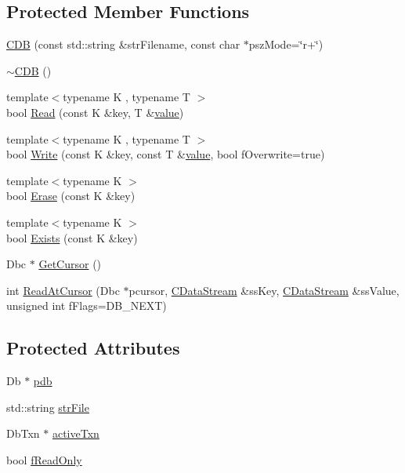 \subsection*{Protected Member Functions}
\begin{DoxyCompactItemize}
\item 
\hyperlink{class_c_d_b_aa5f2317ab28c6424bfebdaa969aa2b2c}{C\+D\+B} (const std\+::string \&str\+Filename, const char $\ast$psz\+Mode=\char`\"{}r+\char`\"{})
\item 
\hyperlink{class_c_d_b_af4f5b02f07e4c381c17c926bc6853bf7}{$\sim$\+C\+D\+B} ()
\item 
{\footnotesize template$<$typename K , typename T $>$ }\\bool \hyperlink{class_c_d_b_adfd2c079df629d5f7cac0ca923ffd698}{Read} (const K \&key, T \&\hyperlink{cache_8cc_a0f61d63b009d0880a89c843bd50d8d76}{value})
\item 
{\footnotesize template$<$typename K , typename T $>$ }\\bool \hyperlink{class_c_d_b_a7fb5b4fa36e57e17287f2c1c762bd708}{Write} (const K \&key, const T \&\hyperlink{cache_8cc_a0f61d63b009d0880a89c843bd50d8d76}{value}, bool f\+Overwrite=true)
\item 
{\footnotesize template$<$typename K $>$ }\\bool \hyperlink{class_c_d_b_a3f7e1ba9dd41de3fb1525d789405a6c3}{Erase} (const K \&key)
\item 
{\footnotesize template$<$typename K $>$ }\\bool \hyperlink{class_c_d_b_a5f7d7854dcbcec1b1f85bc6a0008563e}{Exists} (const K \&key)
\item 
Dbc $\ast$ \hyperlink{class_c_d_b_a5ea1cb8e2f2e9ad357d5e37619eabed2}{Get\+Cursor} ()
\item 
int \hyperlink{class_c_d_b_aa3f7c529fd233c106dca32845b593232}{Read\+At\+Cursor} (Dbc $\ast$pcursor, \hyperlink{class_c_data_stream}{C\+Data\+Stream} \&ss\+Key, \hyperlink{class_c_data_stream}{C\+Data\+Stream} \&ss\+Value, unsigned int f\+Flags=D\+B\+\_\+\+N\+E\+X\+T)
\end{DoxyCompactItemize}
\subsection*{Protected Attributes}
\begin{DoxyCompactItemize}
\item 
Db $\ast$ \hyperlink{class_c_d_b_a4520f55d31246fc06d80f72b5dd62253}{pdb}
\item 
std\+::string \hyperlink{class_c_d_b_a15c6112d9db9dcc5f11a2c05d9aa74a5}{str\+File}
\item 
Db\+Txn $\ast$ \hyperlink{class_c_d_b_ac06d74a2d113f593869d2f93188a0adc}{active\+Txn}
\item 
bool \hyperlink{class_c_d_b_a92ca6c13982a03afdb846588a61608fc}{f\+Read\+Only}
\end{DoxyCompactItemize}


